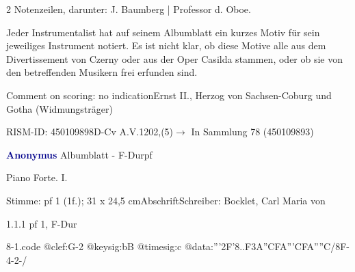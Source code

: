\documentclass[a4paper, twocolumn, 11pt]{book}
\begin{document}
\newline %
\par 2 Notenzeilen, darunter: J. Baumberg | Professor d. Oboe.
\par Jeder Instrumentalist hat auf seinem Albumblatt ein kurzes Motiv für sein jeweiliges Instrument notiert. Es ist nicht klar, ob diese Motive alle aus dem {\textquotedbl}Divertissement{\textquotedbl} von Czerny oder aus der Oper {\textquotedbl}Casilda{\textquotedbl} stammen, oder ob sie von den betreffenden Musikern frei erfunden sind.
\par Comment on scoring: no indication\newline Ernst II., Herzog von Sachsen-Coburg und Gotha  (Widmungsträger)
\par RISM-ID: 450109898\newline D-Cv  A.V.1202,(5)\newline $\rightarrow$ In Sammlung 78 (450109893)
      
\par \vspace{16pt} \textcolor{darkblue}{\textbf{Anonymus  }}\hfillplus{[8]}\newline Albumblatt - F-Dur\newline pf
\par \begin{itshape}[heading:] Piano Forte. I.\end{itshape} 
\par \textcolor{darkblue}{}  Stimme: pf 1  (1f.); 31 x 24,5 cm\newline Abschrift\newline Schreiber: Bocklet, Carl Maria von
\par 1.1.1  pf 1, F-Dur  
\begin{filecontents*}{8-1.code}
@clef:G-2
@keysig:bB
@timesig:c
@data:'''2F'{8..F3A}{''CFA'''CFA''''C}/8F-4-2-/
\end{filecontents*}
\end{document}
